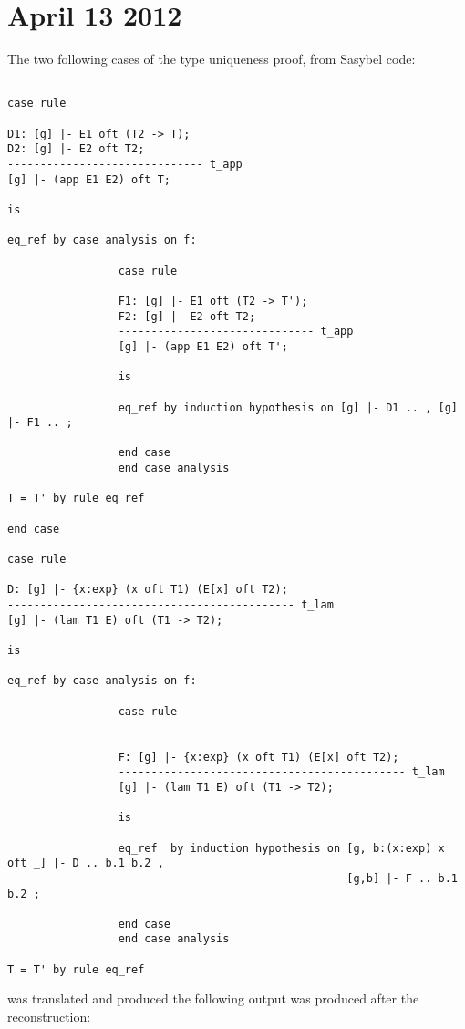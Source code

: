 \documentclass[12pt]{article}
\begin{document}
\section{April 13 2012}
The two following cases of the type uniqueness proof, from \textmd{Sasybel} code:
\footnotesize\begin{verbatim}

case rule

D1: [g] |- E1 oft (T2 -> T);
D2: [g] |- E2 oft T2;
------------------------------ t_app
[g] |- (app E1 E2) oft T;

is

eq_ref by case analysis on f:

                 case rule

                 F1: [g] |- E1 oft (T2 -> T');
                 F2: [g] |- E2 oft T2;
                 ------------------------------ t_app
                 [g] |- (app E1 E2) oft T';

                 is

                 eq_ref by induction hypothesis on [g] |- D1 .. , [g] |- F1 .. ;

                 end case
                 end case analysis

T = T' by rule eq_ref

end case

case rule

D: [g] |- {x:exp} (x oft T1) (E[x] oft T2);
-------------------------------------------- t_lam
[g] |- (lam T1 E) oft (T1 -> T2);

is

eq_ref by case analysis on f:

                 case rule


                 F: [g] |- {x:exp} (x oft T1) (E[x] oft T2);
                 -------------------------------------------- t_lam
                 [g] |- (lam T1 E) oft (T1 -> T2);

                 is

                 eq_ref  by induction hypothesis on [g, b:(x:exp) x oft _] |- D .. b.1 b.2 ,
                                                    [g,b] |- F .. b.1 b.2 ;

                 end case
                 end case analysis

T = T' by rule eq_ref

\end{verbatim}
was translated and produced the following output was produced after the reconstruction:
\end{document}
